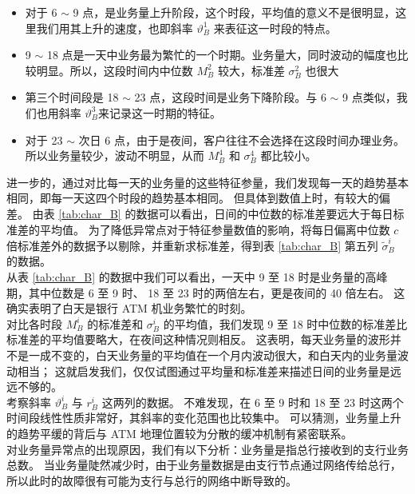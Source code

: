 \documentclass[a4paper]{article}
\begin{document}
\begin{itemize}
    \item 对于 6 $\sim$ 9 点，是业务量上升阶段，这个时段，平均值的意义不是很明显，这里我们用其上升的速度，也即斜率 $\vartheta_B^1$ 来表征这一时段的特点。
    \item 9 $\sim$ 18 点是一天中业务最为繁忙的一个时期。业务量大，同时波动的幅度也比较明显。所以，这段时间内中位数 $M_B^2$ 较大，标准差 $\sigma_B^2$ 也很大
    \item 第三个时间段是 18 $\sim$ 23 点，这段时间是业务下降阶段。与 6 $\sim$ 9 点类似，我们也用斜率 $\vartheta_B^3$来记录这一时期的特征。
    \item 对于 23 $\sim$ 次日 6 点，由于是夜间，客户往往不会选择在这段时间办理业务。所以业务量较少，波动不明显，从而 $M_B^4$ 和 $\sigma_B^4$ 都比较小。
\end{itemize}
进一步的，通过对比每一天的业务量的这些特征参量，我们发现每一天的趋势基本相同，即每一天这四个时段的趋势基本相同。
但具体到数值上时，有较大的偏差。
由表 \ref{tab:char_B} 的数据可以看出，日间的中位数的标准差要远大于每日标准差的平均值。
为了降低异常点对于特征参量数值的影响，将每日偏离中位数 $c$ 倍标准差外的数据予以剔除，并重新求标准差，得到表 \ref{tab:char_B} 第五列 $\tilde{\sigma}_B^i$ 的数据。
\\
\indent 从表 \ref{tab:char_B} 的数据中我们可以看出，一天中 9 至 18 时是业务量的高峰期，其中位数是 6 至 9 时、 18 至 23 时的两倍左右，更是夜间的 40 倍左右。
这确实表明了白天是银行 ATM 机业务繁忙的时刻。
\\
\indent 对比各时段 $M_B^i$ 的标准差和 $\sigma_B^i$ 的平均值，我们发现 9 至 18 时中位数的标准差比标准差的平均值要略大，在夜间这种情况则相反。
这表明，每天业务量的波形并不是一成不变的，白天业务量的平均值在一个月内波动很大，和白天内的业务量波动相当；
这就启发我们，仅仅试图通过平均量和标准差来描述日间的业务量是远远不够的。
\\
\indent 考察斜率 $\vartheta_B^i$ 与 $r_B^i$ 这两列的数据。
不难发现，在 6 至 9 时和 18 至 23 时这两个时间段线性性质非常好，其斜率的变化范围也比较集中。
可以猜测，业务量上升的趋势平缓的背后与 ATM 地理位置较为分散的缓冲机制有紧密联系。
\\
\indent 对业务量异常点的出现原因，我们有以下分析：业务量是指总行接收到的支行业务总数。
当业务量陡然减少时，由于业务量数据是由支行节点通过网络传给总行，所以此时的故障很有可能为支行与总行的网络中断导致的。
\end{document}
